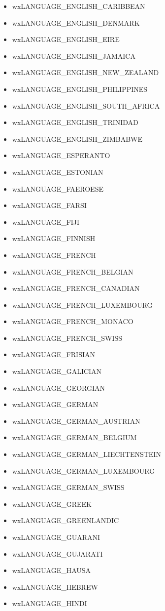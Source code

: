 \begin{itemize}
\item wxLANGUAGE\_ENGLISH\_CARIBBEAN
\item wxLANGUAGE\_ENGLISH\_DENMARK
\item wxLANGUAGE\_ENGLISH\_EIRE
\item wxLANGUAGE\_ENGLISH\_JAMAICA
\item wxLANGUAGE\_ENGLISH\_NEW\_ZEALAND
\item wxLANGUAGE\_ENGLISH\_PHILIPPINES
\item wxLANGUAGE\_ENGLISH\_SOUTH\_AFRICA
\item wxLANGUAGE\_ENGLISH\_TRINIDAD
\item wxLANGUAGE\_ENGLISH\_ZIMBABWE
\item wxLANGUAGE\_ESPERANTO
\item wxLANGUAGE\_ESTONIAN
\item wxLANGUAGE\_FAEROESE
\item wxLANGUAGE\_FARSI
\item wxLANGUAGE\_FIJI
\item wxLANGUAGE\_FINNISH
\item wxLANGUAGE\_FRENCH
\item wxLANGUAGE\_FRENCH\_BELGIAN
\item wxLANGUAGE\_FRENCH\_CANADIAN
\item wxLANGUAGE\_FRENCH\_LUXEMBOURG
\item wxLANGUAGE\_FRENCH\_MONACO
\item wxLANGUAGE\_FRENCH\_SWISS
\item wxLANGUAGE\_FRISIAN
\item wxLANGUAGE\_GALICIAN
\item wxLANGUAGE\_GEORGIAN
\item wxLANGUAGE\_GERMAN
\item wxLANGUAGE\_GERMAN\_AUSTRIAN
\item wxLANGUAGE\_GERMAN\_BELGIUM
\item wxLANGUAGE\_GERMAN\_LIECHTENSTEIN
\item wxLANGUAGE\_GERMAN\_LUXEMBOURG
\item wxLANGUAGE\_GERMAN\_SWISS
\item wxLANGUAGE\_GREEK
\item wxLANGUAGE\_GREENLANDIC
\item wxLANGUAGE\_GUARANI
\item wxLANGUAGE\_GUJARATI
\item wxLANGUAGE\_HAUSA
\item wxLANGUAGE\_HEBREW
\item wxLANGUAGE\_HINDI

\end{itemize}
